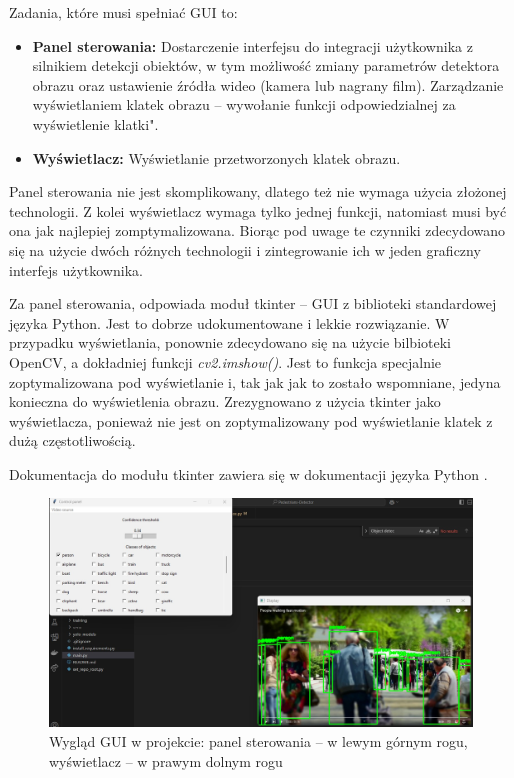 Zadania, które musi spełniać GUI to:
\begin{itemize}
    \item \textbf{Panel sterowania:} Dostarczenie interfejsu do integracji użytkownika z silnikiem detekcji obiektów, w tym możliwość zmiany parametrów detektora obrazu oraz ustawienie źródła wideo (kamera lub nagrany film). Zarządzanie wyświetlaniem klatek obrazu -- wywołanie funkcji odpowiedzialnej za wyświetlenie klatki".
    \item \textbf{Wyświetlacz: } Wyświetlanie przetworzonych klatek obrazu.
\end{itemize}

Panel sterowania nie jest skomplikowany, dlatego też nie wymaga użycia złożonej technologii. Z kolei wyświetlacz wymaga tylko jednej funkcji, natomiast musi być ona jak najlepiej zomptymalizowana. Biorąc pod uwage te czynniki zdecydowano się na użycie dwóch różnych technologii i zintegrowanie ich w jeden graficzny interfejs użytkownika.

Za panel sterowania, odpowiada moduł tkinter -- GUI z biblioteki standardowej języka Python. Jest to dobrze udokumentowane i lekkie rozwiązanie. W przypadku wyświetlania, ponownie zdecydowano się na użycie bilbioteki OpenCV, a dokładniej funkcji \emph{cv2.imshow()}. Jest to funkcja specjalnie zoptymalizowana pod wyświetlanie i, tak jak jak to zostało wspomniane, jedyna konieczna do wyświetlenia obrazu.
Zrezygnowano z użycia tkinter jako wyświetlacza, ponieważ nie jest on zoptymalizowany pod wyświetlanie klatek z dużą częstotliwością. 

Dokumentacja do modułu tkinter zawiera się w dokumentacji języka Python \cite{Python_docs}.

\begin{figure}[H]
    \centering
    \includegraphics[width=\linewidth]{r_technologie/GUI_assets/mockup.jpg}
    \caption{Wygląd GUI w projekcie: panel sterowania -- w lewym górnym rogu, wyświetlacz -- w prawym dolnym rogu}
    \label{fig:technologies-GUI}
\end{figure}